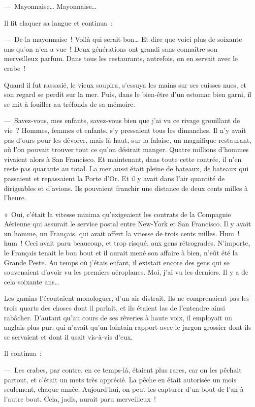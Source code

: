 \documentclass[french,twoside]{book} %
\begin{document}
— Mayonnaise… Mayonnaise…\par
Il fit claquer sa langue et continua :\par
— De la mayonnaise ! Voilà qui serait bon… Et dire que voici plus de soixante ans qu’on n’en a vue ! Deux générations ont grandi sans connaître son merveilleux parfum. Dans tous les restaurants, autrefois, on en servait avec le crabe !\par
Quand il fut rassasié, le vieux soupira, s’essuya les mains sur ses cuisses nues, et son regard se perdit sur la mer. Puis, dans le bien-être d’un estomac bien garni, il se mit à fouiller au tréfonds de sa mémoire.\par
— Savez-vous, mes enfants, savez-vous bien que j’ai vu ce rivage grouillant de vie ? Hommes, femmes et enfants, s’y pressaient tous les dimanches. Il n’y avait pas d’ours pour les dévorer, mais là-haut, sur la falaise, un magnifique restaurant, où l’on pouvait trouver tout ce qu’on désirait manger. Quatre millions d’hommes vivaient alors à San Francisco. Et maintenant, dans toute cette contrée, il n’en reste pas quarante au total. La mer aussi était pleine de bateaux, de bateaux qui passaient et repassaient la Porte d’Or. Et il y avait dans l’air quantité de dirigeables et d’avions. Ils pouvaient franchir une distance de deux cents milles à l’heure.\par
« Oui, c’était la vitesse minima qu’exigeaient les contrats de la Compagnie Aérienne qui assurait le service postal entre New-York et San Francisco. Il y avait un homme, un Français, qui avait offert la vitesse de trois cents milles. Hum ! hum ! Ceci avait paru beaucoup, et trop risqué, aux gens rétrogrades. N’importe, le Français tenait le bon bout et il aurait mené son affaire à bien, n’eût été la Grande Peste. Au temps où j’étais enfant, il existait encore des gens qui se souvenaient d’avoir vu les premiers aéroplanes. Moi, j’ai vu les derniers. Il y a de cela soixante ans…\par
Les gamins l’écoutaient monologuer, d’un air distrait. Ils ne comprenaient pas les trois quarts des choses dont il parlait, et ils étaient las de l’entendre ainsi rabâcher. D’autant qu’au cours de ses rêveries à haute voix, il employait un anglais plus pur, qui n’avait qu’un lointain rapport avec le jargon grossier dont ils se servaient et dont il usait vis-à-vis d’eux.\par
Il continua :\par
— Les crabes, par contre, en ce temps-là, étaient plus rares, car on les pêchait partout, et c’était un mets très apprécié. La pêche en était autorisée un mois seulement, chaque année. Aujourd’hui, on peut les capturer d’un bout de l’an à l’autre bout. Cela, jadis, aurait paru merveilleux !\par
\end{document}

